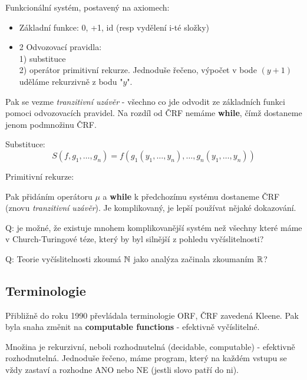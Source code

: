 \begin{note}
	Funkcionální systém, postavený na axiomech:
	\begin{itemize}
		\item Základní funkce: 0, +1, id (resp vydělení i-té složky)
		\item 2 Odvozovací pravidla:\\
			1) substituce \\
			2) operátor primitivní rekurze.
			Jednoduše řečeno, výpočet v bode $(y + 1)$ uděláme rekurzivně z bodu "$y$".
	\end{itemize}

	Pak se vezme \emph{tranzitivní uzávěr} - všechno co jde odvodit ze základních funkci pomoci odvozovacích pravidel.
	Na rozdíl od ČRF nemáme \textbf{while}, čímž dostaneme jenom podmnožinu ČRF.

	Substituce:
	\[ S(f, g_1, \ldots, g_n) = f(g_1(y_1, \ldots, y_n), \ldots, g_n(y_1, \ldots, y_n)) \]

	Primitivní rekurze:

\end{note}

\begin{note}
	Pak přidáním operátoru $\mu$ a \textbf{while} k předchozímu systému dostaneme ČRF (znovu \emph{tranzitivní uzávěr}).
	Je komplikovaný, je lepší používat nějaké dokazování.
\end{note}

Q: je možné, že existuje mnohem komplikovanější systém než všechny které máme v Church-Turingové téze, který by byl silnější z pohledu vyčíslitelnosti?

Q: Teorie vyčíslitelnosti zkoumá $\operatorname{\mathbb{N}}$ jako analýza začinala zkoumaním $\operatorname{\mathbb{R}}$?

\subsection{Terminologie}

Přibližně do roku 1990 převládala terminologie ORF, ČRF zavedená Kleene.
Pak byla snaha změnit na \textbf{computable functions} - efektivně vyčíslitelné.
\begin{definition}
	Množina je rekurzivní, neboli rozhodnutelná (decidable, computable) - efektivně rozhodnutelná.
	Jednoduše řečeno, máme program, který na každém vstupu se vždy zastaví a rozhodne ANO nebo NE (jestli slovo patří do ni).
\end{definition}

